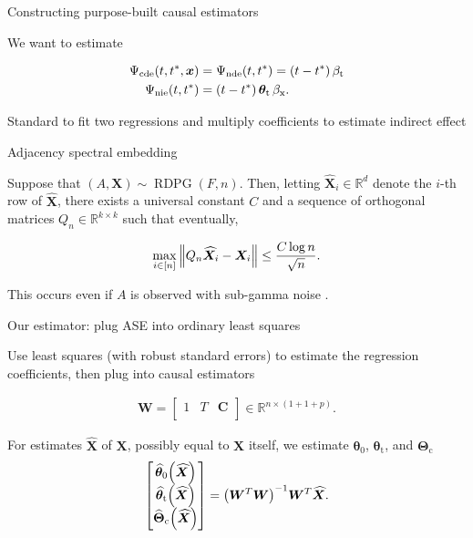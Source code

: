 \documentclass{beamer}
\theoremstyle{remark}
\newcommand{\x}{\bm x}
\newcommand{\C}{\bm C}
\newcommand{\X}{\bm X}
\newcommand{\W}{\bm W}
\newcommand{\Xhat}{\widehat{\X}}
\newcommand \R {\mathbb{R}}
\newcommand{\thetazero}{\bm \theta_0}
\newcommand{\thetat}{\bm \theta_\text{t}}
\newcommand{\Thetac}{\bm \Theta_\text{c}}
\newcommand \thetazerohat [1] {\widehat{\bm \theta}_0 \paren*{#1}}
\newcommand \thetathat [1] {\widehat{\bm \theta}_\text{t} \paren*{#1}}
\newcommand \Thetachat [1] {\widehat{\bm \Theta}_\text{c} \paren*{#1}}
\newcommand{\betat}{\beta_\text{t}}
\newcommand{\betax}{\beta_\text{x}}
\newcommand{\cde}{\Psi_\text{cde} \paren*{t, t^*, \x}}
\newcommand{\nde}{\Psi_\text{nde} \paren*{t, t^*}}
\newcommand{\nie}{\Psi_\text{nie} \paren*{t, t^*}}
\newcommand{\RDPG}{\operatorname{RDPG}}
\newcommand \dist {\sim}
\DeclarePairedDelimiter{\paren}{(}{)}
\DeclarePairedDelimiter{\norm}{\lVert}{\rVert}
\begin{document}
\begin{frame}{Constructing purpose-built causal estimators}

    We want to estimate

    \begin{align*}
        \cde & = \nde = \paren*{t - t^*} \, \betat      \\
        \nie & = \paren*{t - t^*} \, \thetat \, \betax.
    \end{align*}

    Standard to fit two regressions and multiply coefficients to estimate indirect effect \citep{vanderweele_mediation_2014}

\end{frame}

\begin{frame}{Adjacency spectral embedding}

    \begin{lemma}
        \label{lem:2toinfty}

        Suppose that $(A, \X) \dist \RDPG(F,n)$. Then, letting $\Xhat_i \in \R^d$ denote the $i$-th row of $\Xhat$, there exists a universal constant $C$ and a sequence of orthogonal matrices $Q_n \in \R^{k \times k}$ such that eventually,

        \begin{equation*}
            \max_{i \in [n]} \, \norm*{Q_n \Xhat_i - \X_i} \le \frac{C \log n}{\sqrt n}.
        \end{equation*}

        This occurs even if $A$ is observed with sub-gamma noise \citep{levin_recovering_2022}.

    \end{lemma}
\end{frame}

\begin{frame}{Our estimator: plug ASE into ordinary least squares}

    Use least squares (with robust standard errors) to estimate the regression coefficients, then plug into causal estimators

    \begin{align*}
        \W = \begin{bmatrix}
            1 & T & \C \\
        \end{bmatrix} \in \R^{n \times (1 + 1 + p)}.
    \end{align*}

    For estimates $\Xhat$ of $\X$, possibly equal to $\X$ itself, we estimate $\thetazero$, $\thetat$, and $\Thetac$
    \begin{align*}
        \begin{bmatrix}
            \thetazerohat{\Xhat} \\
            \thetathat{\Xhat}    \\
            \Thetachat{\Xhat}
        \end{bmatrix}
        = \paren*{\W^T \W}^{-1} \W^T \Xhat.
    \end{align*}
\end{frame}
\end{document}
